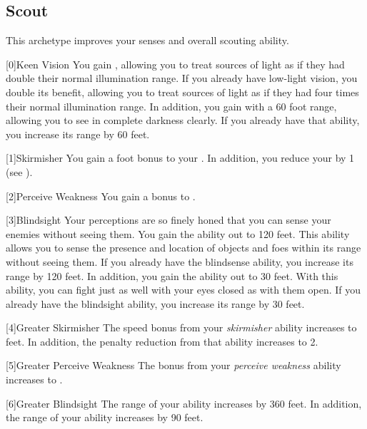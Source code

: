     \newpage
    \subsection{Scout}
        This archetype improves your senses and overall scouting ability.

        [0]{Keen Vision}
        You gain , allowing you to treat sources of light as if they had double their normal illumination range.
        If you already have low-light vision, you double its benefit, allowing you to treat sources of light as if they had four times their normal illumination range.
        In addition, you gain  with a 60 foot range, allowing you to see in complete darkness clearly.
        If you already have that ability, you increase its range by 60 feet.

        [1]{Skirmisher} You gain a  foot bonus to your .
        In addition, you reduce your  by 1 (see ).

        [2]{Perceive Weakness} You gain a  bonus to .

        [3]{Blindsight} Your perceptions are so finely honed that you can sense your enemies without seeing them.
        You gain the  ability out to 120 feet.
        This ability allows you to sense the presence and location of objects and foes within its range without seeing them.
        If you already have the blindsense ability, you increase its range by 120 feet.
        In addition, you gain the  ability out to 30 feet.
        With this ability, you can fight just as well with your eyes closed as with them open.
        If you already have the blindsight ability, you increase its range by 30 feet.

        [4]{Greater Skirmisher} The speed bonus from your \textit{skirmisher} ability increases to  feet.
        In addition, the penalty reduction from that ability increases to 2.

        [5]{Greater Perceive Weakness} The bonus from your \textit{perceive weakness} ability increases to .

        [6]{Greater Blindsight} The range of your  ability increases by 360 feet.
        In addition, the range of your  ability increases by 90 feet.


